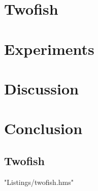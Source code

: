 \documentclass[a4paper,10pt,openright]{memoir}
\begin{document}
\chapter{Twofish}
\label{chapt - Twofish}



\chapter{Experiments}
\label{chapt - Experiments}


\chapter{Discussion}
\label{chapt - Discussion}



\chapter{Conclusion}
\label{chapt - Conclusion}




\newpage

\renewcommand\bibname{References}




\clearpage
\newpage
\begin{appendices}
\renewcommand*{\lstlistingname}{Appendix}
\chapter{Twofish}
\label{appendix:A}
 {"Listings/twofish.hms"}
\end{appendices}
\end{document}
